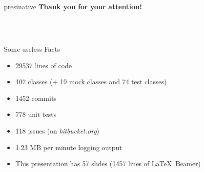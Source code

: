 \documentclass[hyperref={pdfpagelabels=false},compress]{beamer}
\begin{document}
\section{}
\begin{frame}
	\hfill
	\begin{beamercolorbox}[shadow=true, rounded=true, wd=10cm]{presinative}
		\centering
		\Large{\textbf{Thank you for your attention!}}
	\end{beamercolorbox}
	\hfill \\
	\hfill \\
	\begin{block}{Some useless Facts}
		\begin{itemize}
			\item 29537 lines of code					%
			\item 107 classes ($+$ 19 mock classes and 74 test classes)	%
			\item 1452 commits						%
			\item 778 unit tests
			\item 118 issues (on \textit{bitbucket.org})
			\item 1.23 MB per minute logging output
			\item This presentation has 57 slides (1457 lines of \LaTeX\ Beamer)
		\end{itemize}
	\end{block}
\end{frame}
\end{document}
